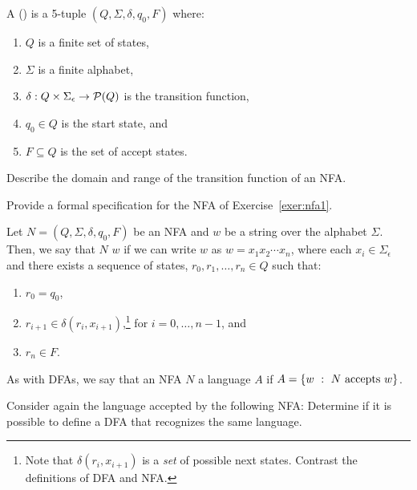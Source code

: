 \documentclass[twoside,letterpaper,openany]{book}
\begin{document}
\clearpage

\begin{defn}
A  () is a 5-tuple $(Q, \Sigma, \delta, q_0, F)$ where:
\begin{enumerate}
\item $Q$ is a finite set of states,
\item $\Sigma$ is a finite alphabet,
\item $\delta : Q \times \Sigma_\epsilon \to \mathcal{P}(Q)$ is the transition function,
\item $q_0 \in Q$ is the start state, and
\item $F \subseteq Q$ is the set of accept states.
\end{enumerate}

\end{defn}

\begin{exer1}
Describe the domain and range of the transition function of an NFA.
\end{exer1}

\begin{exer1}
Provide a formal specification for the NFA of Exercise~\ref{exer:nfa1}.
\end{exer1}

\begin{defn}
Let $N = (Q, \Sigma, \delta, q_0, F)$ be an NFA and $w$ be a string over the alphabet $\Sigma$. Then, we say that $N$  $w$ if we can write $w$ as $w = x_1 x_2 \cdots x_n$, where each $x_i \in \Sigma_\epsilon$ and there exists a sequence of states, $r_0, r_1, \ldots, r_n \in Q$ such that:
\begin{enumerate}
\item $r_0 = q_0$,
\item $r_{i+1} \in \delta(r_i, x_{i+1})$,\footnote{Note that $\delta(r_i, x_{i+1})$ is a \emph{set} of possible next states. Contrast the definitions of DFA and NFA.} for $i = 0, \ldots, n-1$, and
\item $r_n \in F$.
\end{enumerate}

As with DFAs, we say that an NFA $N$  a language $A$ if $A = \left\lbrace w\ :\ N~\textrm{accepts}~w \right\rbrace$.
\end{defn}

\begin{exer2}
Consider again the language accepted by the following NFA:
\exernfaOne
Determine if it is possible to define a DFA that recognizes the same language.
\end{exer2}
\end{document}
